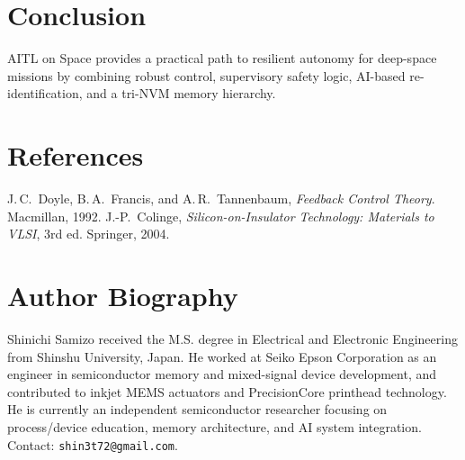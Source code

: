\documentclass[conference]{IEEEtran}
\begin{document}
\section{Conclusion}
AITL on Space provides a practical path to resilient autonomy for deep-space missions by combining robust control, supervisory safety logic, AI-based re-identification, and a tri-NVM memory hierarchy.

\section*{References}
\begin{thebibliography}{99}
J.\,C.~Doyle, B.\,A.~Francis, and A.\,R.~Tannenbaum, \emph{Feedback Control Theory}. Macmillan, 1992.
J.-P.~Colinge, \emph{Silicon-on-Insulator Technology: Materials to VLSI}, 3rd ed. Springer, 2004.
\end{thebibliography}

\section*{Author Biography}
Shinichi Samizo received the M.S. degree in Electrical and Electronic Engineering from Shinshu University, Japan. He worked at Seiko Epson Corporation as an engineer in semiconductor memory and mixed-signal device development, and contributed to inkjet MEMS actuators and PrecisionCore printhead technology. He is currently an independent semiconductor researcher focusing on process/device education, memory architecture, and AI system integration. Contact: \texttt{shin3t72@gmail.com}.

\FloatBarrier %
\end{document}
